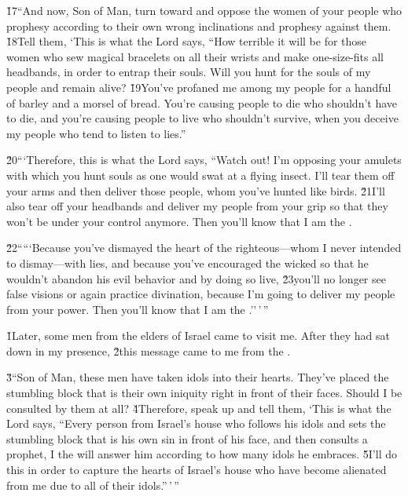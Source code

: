 \v{17}``And now, Son of Man, turn toward and oppose the women of your people who prophesy according to their own wrong inclinations and prophesy against them. \v{18}Tell them, `This is what the Lord  says, ``How terrible it will be for those women who sew magical bracelets on all their wrists and make one-size-fits all headbands, in order to entrap their souls. Will you hunt for the souls of my people and remain alive? \v{19}You've profaned me among my people for a handful of barley and a morsel of bread. You're causing people to die who shouldn't have to die, and you're causing people to live who shouldn't survive, when you deceive my people who tend to listen to lies.''

\v{20}```Therefore, this is what the Lord  says, ``Watch out! I'm opposing your amulets with which you hunt souls as one would swat at a flying insect. I'll tear them off your arms and then deliver those people, whom you've hunted like birds. \v{21}I'll also tear off your headbands and deliver my people from your grip so that they won't be under your control anymore. Then you'll know that I am the .

\v{22}`````Because you've dismayed the heart of the righteous---whom I never intended to dismay---with lies, and because you've encouraged the wicked so that he wouldn't abandon his evil behavior and by doing so live, \v{23}you'll no longer see false visions or again practice divination, because I'm going to deliver my people from your power. Then you'll know that I am the .''\,'\,''

\v{1}Later, some men from the elders of Israel came to visit me. After they had sat down in my presence, \v{2}this message came to me from the .

\v{3}``Son of Man, these men have taken idols into their hearts. They've placed the stumbling block that is their own iniquity right in front of their faces. Should I be consulted by them at all? \v{4}Therefore, speak up and tell them, `This is what the Lord  says, ``Every person from Israel's house who follows his idols and sets the stumbling block that is his own sin in front of his face, and then consults a prophet, I the  will answer him according to how many idols he embraces. \v{5}I'll do this in order to capture the hearts of Israel's house who have become alienated from me due to all of their idols.''\,'\,''

